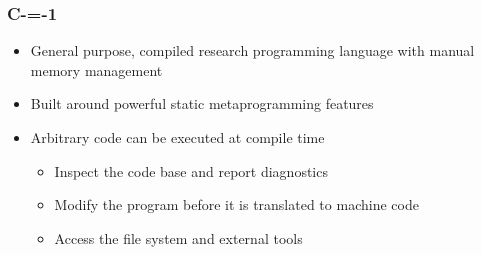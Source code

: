 \begin{frame}
	\frametitle{C-=-1}

	\begin{itemize}
		\item General purpose, compiled research programming language with manual memory management
		\item Built around powerful static metaprogramming features
		\item Arbitrary code can be executed at compile time\begin{itemize}
			\item Inspect the code base and report diagnostics
			\item Modify the program before it is translated to machine code
			\item Access the file system and external tools
		\end{itemize}
	\end{itemize}

\end{frame}
